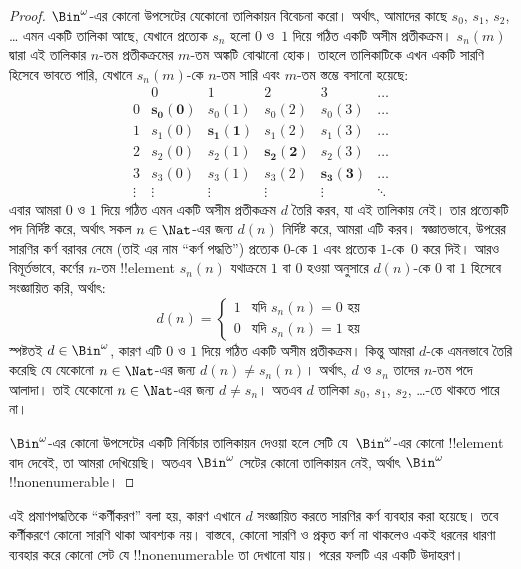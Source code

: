 \documentclass[../../../include/open-logic-section]{subfiles}
\begin{document}
\begin{proof}
$\Bin^\omega$-এর কোনো উপসেটের যেকোনো তালিকায়ন বিবেচনা করো। অর্থাৎ, আমাদের কাছে $s_{0}$, $s_{1}$, $s_{2}$, \dots{} এমন একটি তালিকা আছে, যেখানে প্রত্যেক $s_n$ হলো $0$ ও~$1$ দিয়ে গঠিত একটি অসীম প্রতীকক্রম। $s_n(m)$ দ্বারা এই তালিকার $n$-তম প্রতীকক্রমের $m$-তম অঙ্কটি বোঝানো হোক। 
তাহলে তালিকাটিকে এখন একটি সারণি হিসেবে ভাবতে পারি, যেখানে $s_n(m)$-কে $n$-তম সারি এবং $m$-তম স্তম্ভে বসানো হয়েছে:
\[
\begin{array}{c|c|c|c|c|c}
& 0 & 1 & 2 & 3 & \dots \\\hline
0 & \mathbf{s_{0}(0)} & s_{0}(1) & s_{0}(2) & s_0(3) & \dots \\\hline
1 & s_{1}(0)& \mathbf{s_{1}(1)} & s_1(2) & s_1(3) & \dots \\\hline
2 & s_{2}(0)& s_{2}(1) & \mathbf{s_2(2)} & s_2(3) & \dots \\\hline
3 & s_{3}(0)& s_{3}(1) & s_3(2) & \mathbf{s_3(3)} & \dots \\\hline
\vdots & \vdots & \vdots & \vdots & \vdots & \mathbf{\ddots}
\end{array}
\]
এবার আমরা $0$ ও $1$ দিয়ে গঠিত এমন একটি অসীম প্রতীকক্রম $d$ তৈরি করব, যা এই তালিকায় নেই। তার প্রত্যেকটি পদ নির্দিষ্ট করে, অর্থাৎ সকল $n \in \Nat$-এর জন্য $d(n)$ নির্দিষ্ট করে, আমরা এটি করব। স্বজ্ঞাতভাবে, উপরের সারণির কর্ণ বরাবর নেমে (তাই এর নাম ``কর্ণ পদ্ধতি'') প্রত্যেক $0$-কে $1$ এবং প্রত্যেক $1$-কে~$0$ করে দিই। 
আরও বিমূর্তভাবে, কর্ণের $n$-তম !!{element} $s_n(n)$ যথাক্রমে $1$ বা $0$ হওয়া অনুসারে $d(n)$-কে $0$ বা $1$ হিসেবে সংজ্ঞায়িত করি, অর্থাৎ:
\[
d(n) =
\begin{cases}
1 & \text{যদি $s_{n}(n) = 0$ হয়}\\
0 & \text{যদি $s_{n}(n) = 1$ হয়}
\end{cases}
\]
স্পষ্টতই $d \in \Bin^\omega$, কারণ এটি $0$ ও $1$ দিয়ে গঠিত একটি অসীম প্রতীকক্রম। কিন্তু আমরা $d$-কে এমনভাবে তৈরি করেছি যে যেকোনো $n \in \Nat$-এর জন্য $d(n) \neq s_n(n)$। অর্থাৎ, $d$ ও $s_n$ তাদের $n$-তম পদে আলাদা। তাই যেকোনো $n\in \Nat$-এর জন্য $d \neq s_n$। অতএব $d$ তালিকা $s_0$, $s_1$, $s_2$,
\dots{}-তে থাকতে পারে না।

$\Bin^\omega$-এর কোনো উপসেটের একটি নির্বিচার তালিকায়ন দেওয়া হলে সেটি যে~$\Bin^\omega$-এর কোনো !!{element} বাদ দেবেই, তা আমরা দেখিয়েছি। অতএব $\Bin^\omega$ সেটের কোনো তালিকায়ন নেই, অর্থাৎ $\Bin^\omega$ !!{nonenumerable}।
\end{proof}

\begin{explain}
এই প্রমাণপদ্ধতিকে ``কর্ণীকরণ'' বলা হয়, কারণ এখানে $d$ সংজ্ঞায়িত করতে সারণির কর্ণ ব্যবহার করা হয়েছে। তবে কর্ণীকরণে কোনো সারণি থাকা আবশ্যক নয়। বাস্তবে, কোনো সারণি ও প্রকৃত কর্ণ না থাকলেও একই ধরনের ধারণা ব্যবহার করে কোনো সেট যে
!!{nonenumerable} তা দেখানো যায়। পরের ফলটি এর একটি উদাহরণ।
\end{explain}
\end{document}
